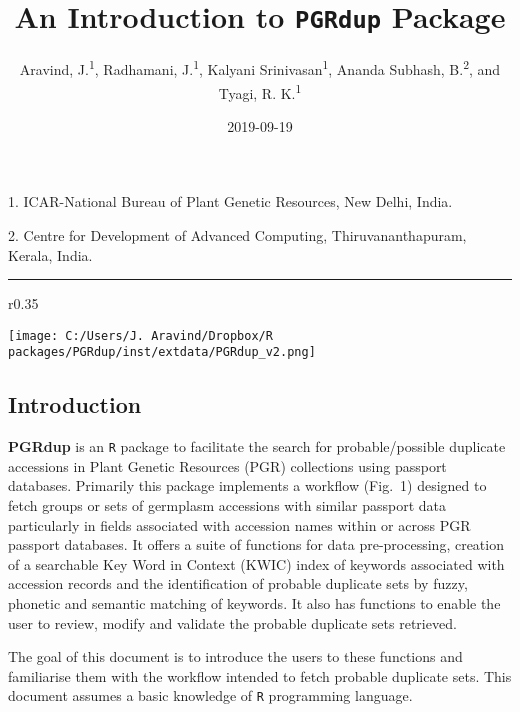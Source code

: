 \documentclass[]{article}
\title{An Introduction to \texttt{PGRdup} Package}
\author{Aravind, J.\textsuperscript{1}, Radhamani, J.\textsuperscript{1},
Kalyani Srinivasan\textsuperscript{1}, Ananda Subhash,
B.\textsuperscript{2}, and Tyagi, R. K.\textsuperscript{1}}
\date{2019-09-19}
\begin{document}
\maketitle

{
\setcounter{tocdepth}{3}
\tableofcontents
}
\begin{center}
1. ICAR-National Bureau of Plant Genetic Resources, New Delhi, India.

2. Centre for Development of Advanced Computing, Thiruvananthapuram, Kerala, India.

\end{center}

\begin{center}
\vspace{6pt}
\hrule
\end{center}

\tableofcontents

\begin{wrapfigure}{r}{0.35\textwidth}
  \vspace{1cm}
  \begin{center}
    \texttt{[image: C:/Users/J. Aravind/Dropbox/R packages/PGRdup/inst/extdata/PGRdup\_v2.png]}
  \end{center}
  \vspace{-1.5cm}
\end{wrapfigure}\leavevmode

\hypertarget{introduction}{%
\subsection{Introduction }\label{introduction}}

\textbf{PGRdup} is an \texttt{R} package to facilitate the search for
probable/possible duplicate accessions in Plant Genetic Resources (PGR)
collections using passport databases. Primarily this package implements
a workflow (Fig.~1) designed to fetch groups or sets of germplasm
accessions with similar passport data particularly in fields associated
with accession names within or across PGR passport databases. It offers
a suite of functions for data pre-processing, creation of a searchable
Key Word in Context (KWIC) index of keywords associated with accession
records and the identification of probable duplicate sets by fuzzy,
phonetic and semantic matching of keywords. It also has functions to
enable the user to review, modify and validate the probable duplicate
sets retrieved.

The goal of this document is to introduce the users to these functions
and familiarise them with the workflow intended to fetch probable
duplicate sets. This document assumes a basic knowledge of \texttt{R}
programming language.
\end{document}
